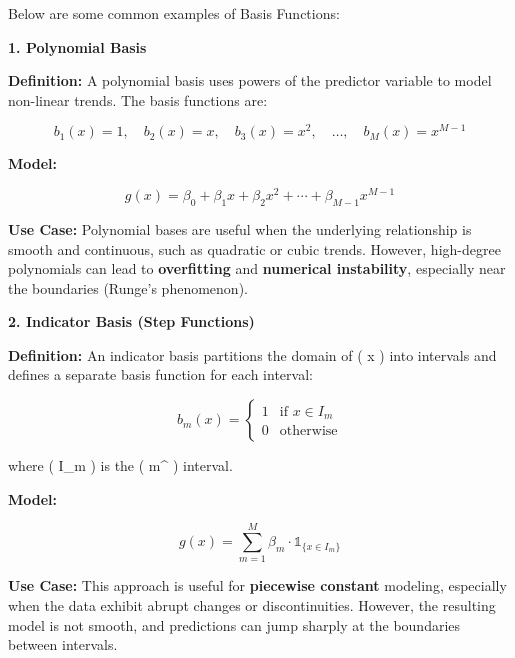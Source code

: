 \documentclass[
  letterpaper,
  DIV=11,
  numbers=noendperiod]{scrreprt}
\begin{document}
Below are some common examples of Basis Functions:

\begin{tcolorbox}[enhanced jigsaw, rightrule=.15mm, breakable, left=2mm, colframe=quarto-callout-tip-color-frame, opacityback=0, leftrule=.75mm, toprule=.15mm, colback=white, arc=.35mm, bottomrule=.15mm]

\textbf{1. \textbf{Polynomial Basis}}\vspace{2mm}

\textbf{Definition:} A polynomial basis uses powers of the predictor
variable to model non-linear trends. The basis functions are:

\[
b_1(x) = 1,\quad b_2(x) = x,\quad b_3(x) = x^2,\quad \ldots,\quad b_M(x) = x^{M-1}
\]

\textbf{Model:}

\[
g(x) = \beta_0 + \beta_1 x + \beta_2 x^2 + \cdots + \beta_{M-1} x^{M-1}
\]

\textbf{Use Case:} Polynomial bases are useful when the underlying
relationship is smooth and continuous, such as quadratic or cubic
trends. However, high-degree polynomials can lead to
\textbf{overfitting} and \textbf{numerical instability}, especially near
the boundaries (Runge's phenomenon).

\end{tcolorbox}

\begin{tcolorbox}[enhanced jigsaw, rightrule=.15mm, breakable, left=2mm, colframe=quarto-callout-tip-color-frame, opacityback=0, leftrule=.75mm, toprule=.15mm, colback=white, arc=.35mm, bottomrule=.15mm]

\textbf{2. \textbf{Indicator Basis (Step Functions)}}\vspace{2mm}

\textbf{Definition:} An indicator basis partitions the domain of ( x )
into intervals and defines a separate basis function for each interval:

\[
b_m(x) = 
\begin{cases}
1 & \text{if } x \in I_m \\
0 & \text{otherwise}
\end{cases}
\]

where ( I\_m ) is the ( m\^{} ) interval.

\textbf{Model:}

\[
g(x) = \sum_{m=1}^M \beta_m \cdot \mathbb{1}_{\{x \in I_m\}}
\]

\textbf{Use Case:} This approach is useful for \textbf{piecewise
constant} modeling, especially when the data exhibit abrupt changes or
discontinuities. However, the resulting model is not smooth, and
predictions can jump sharply at the boundaries between intervals.

\end{tcolorbox}
\end{document}
